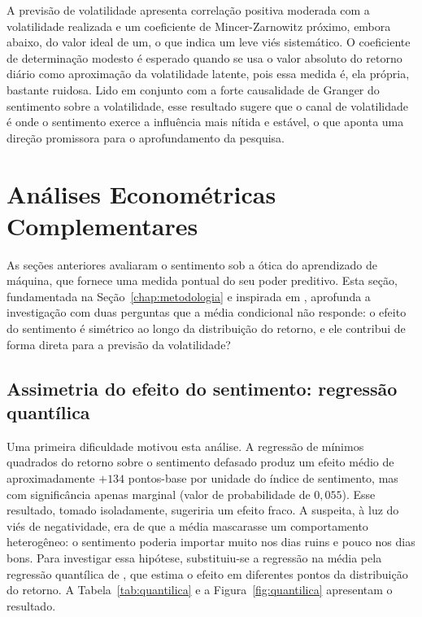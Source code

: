 A previsão de volatilidade apresenta correlação positiva moderada com a volatilidade realizada e um coeficiente de Mincer-Zarnowitz próximo, embora abaixo, do valor ideal de um, o que indica um leve viés sistemático. O coeficiente de determinação modesto é esperado quando se usa o valor absoluto do retorno diário como aproximação da volatilidade latente, pois essa medida é, ela própria, bastante ruidosa. Lido em conjunto com a forte causalidade de Granger do sentimento sobre a volatilidade, esse resultado sugere que o canal de volatilidade é onde o sentimento exerce a influência mais nítida e estável, o que aponta uma direção promissora para o aprofundamento da pesquisa.

\section{Análises Econométricas Complementares}

As seções anteriores avaliaram o sentimento sob a ótica do aprendizado de máquina, que fornece uma medida pontual do seu poder preditivo. Esta seção, fundamentada na Seção~\ref{chap:metodologia} e inspirada em , aprofunda a investigação com duas perguntas que a média condicional não responde: o efeito do sentimento é simétrico ao longo da distribuição do retorno, e ele contribui de forma direta para a previsão da volatilidade?

\subsection{Assimetria do efeito do sentimento: regressão quantílica}
\label{sec:quantilica}

Uma primeira dificuldade motivou esta análise. A regressão de mínimos quadrados do retorno sobre o sentimento defasado produz um efeito médio de aproximadamente $+134$ pontos-base por unidade do índice de sentimento, mas com significância apenas marginal (valor de probabilidade de $0{,}055$). Esse resultado, tomado isoladamente, sugeriria um efeito fraco. A suspeita, à luz do viés de negatividade, era de que a média mascarasse um comportamento heterogêneo: o sentimento poderia importar muito nos dias ruins e pouco nos dias bons. Para investigar essa hipótese, substituiu-se a regressão na média pela regressão quantílica de , que estima o efeito em diferentes pontos da distribuição do retorno. A Tabela~\ref{tab:quantilica} e a Figura~\ref{fig:quantilica} apresentam o resultado.

